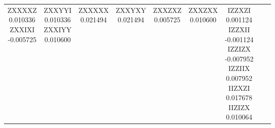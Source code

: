 \documentclass[twocolumn]{revtex4-1}
\newcommand{\1}{\mathbbm{1}}
\begin{document}
\begin{longtable}{|c|c|c|c|c|c|c|c|c|}
\parbox{1.9cm}{\centering\vspace{.5\baselineskip}
ZXXXXZ\\
0.010336\\ 
ZXXIXI\\
-0.005725\\ 
\vspace{.5\baselineskip}}
&
\parbox{1.9cm}{\centering\vspace{.5\baselineskip}
ZXXYYI\\
0.010336\\ 
ZXXIYY\\
0.010600\\ 
\vspace{.5\baselineskip}}
&
\parbox{1.9cm}{\centering\vspace{.5\baselineskip}
ZXXXXX\\
0.021494\\ 
\vspace{.5\baselineskip}}
&
\parbox{1.9cm}{\centering\vspace{.5\baselineskip}
ZXXYXY\\
0.021494\\ 
\vspace{.5\baselineskip}}
&
\parbox{1.9cm}{\centering\vspace{.5\baselineskip}
ZXXZXZ\\
0.005725\\ 
\vspace{.5\baselineskip}}
&
\parbox{1.9cm}{\centering\vspace{.5\baselineskip}
ZXXZXX\\
0.010600\\ 
\vspace{.5\baselineskip}}
&
\parbox{1.9cm}{\centering\vspace{.5\baselineskip}
IZZXZI\\
0.001124\\ 
IZZXII\\
-0.001124\\ 
IZZIZX\\
-0.007952\\ 
IZZIIX\\
0.007952\\ 
IIZXZI\\
0.017678\\ 
IIZIZX\\
0.010064\\ 
\vspace{.5\baselineskip}}
&
\parbox{1.9cm}{\centering\vspace{.5\baselineskip}
}
\end{longtable}
\end{document}
